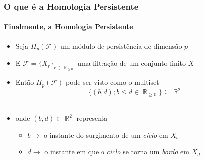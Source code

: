 \documentclass[11pt]{beamer}
\DeclareMathOperator{\R}{\mathbb{R}}
\theoremstyle{remark}
\theoremstyle{definition}
\theoremstyle{plain}
\begin{document}
    \begin{frame}
        \frametitle{O que é a Homologia Persistente}
        \framesubtitle{Finalmente, a Homologia Persistente}

        \begin{itemize}
            \item
                Seja $H_p(\mathcal{F})$ um módulo de persistência de dimensão $p$\\[0.5cm]

            \item
                E $\mathcal{F} = \{X_r\}_{r \in \R_{\geq 0}}$ uma filtração de um 
                conjunto finito $X$\\[0.5cm]

            \item
                Então $H_p(\mathcal{F})$ pode ser visto como o multiset
                \begin{equation*}
                    \{ (b, d); b \leq d \in \R_{\geq 0} \} \subseteq \R^2
                \end{equation*}\\[0.5cm]

            \item
                onde $(b,d) \in \R^2$ representa 
                \begin{itemize}
                    \item
                        $b \to$ o instante do surgimento de um \textit{ciclo} em $X_b$
                    \item
                        $d \to$ o instante em que o \textit{ciclo} se torna
                                um \textit{bordo} em $X_d$

                \end{itemize}



        \end{itemize}
    \end{frame}
\end{document}
